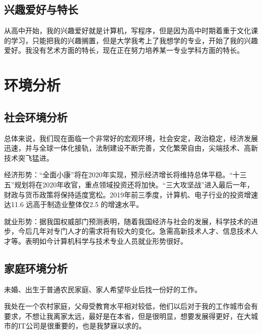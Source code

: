 \documentclass{article}
\begin{document}
\subsection{兴趣爱好与特长}
\par
从高中开始，我的兴趣爱好就是计算机，写程序，但是因为高中时期着重于文化课的学习，只能把我的兴趣搁置，但是大学我考上了我想学的专业，开始了我的兴趣爱好。我没有艺术方面的特长，现在正在努力培养某一专业学科方面的特长。\par
\section{环境分析}

\subsection{社会环境分析}
\par
总体来说，我们现在面临一个非常好的宏观环境，社会安定，政治稳定，经济发展迅速，并与全球一体化接轨，法制建设不断完善，文化繁荣自由，尖端技术、高新技术突飞猛进。\par
经济形势：“全面小康”将在2020年实现，预示经济增长将维持总体平稳。“十三五”规划将在2020年收官，重点领域投资还将加快。“三大攻坚战”进入最后一年，财政与货币政策将保持适度宽松。2019年前三季度，计算机、电子行业的投资增速达11.6%
远高于制造业整体仅2.5%
的增速水平。\par
就业形势：据我国权威部门预测表明，随着我国经济与社会的发展，科学技术的进步，今后几年对专门人才的需求将有较大的变化。急需高新技术人才、信息技术人才等。表明如今计算机科学与技术专业人员就业形势很好。\par

\subsection{家庭环境分析}
\par
未婚、出生于普通农民家庭、家人希望毕业后找一份好的工作。\par
我处在一个农村家庭，父母受教育水平相对较低，他们以后对于我的工作城市会有要求，不想让我离家太远，最好是在本省，但是很明显，想要发展得更好，在大城市的IT公司是很重要的，也是我梦寐以求的。\par
\end{document}
